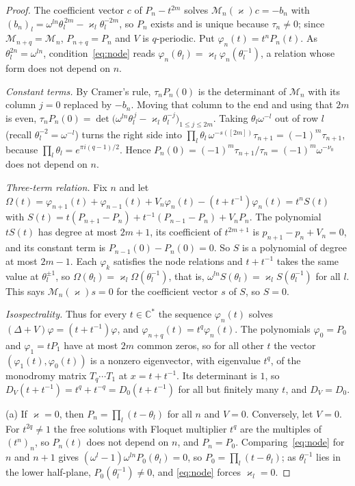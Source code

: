 \documentclass[11pt,reqno]{amsart}
\theoremstyle{definition}
\theoremstyle{remark}
\newcommand{\C}{\mathbb C}
\begin{document}
\begin{proof}
The coefficient vector $c$ of $P_n-t^{2m}$ solves $\mathcal M_n(\varkappa)c=-b_n$ with
$(b_n)_l=\omega^{ln}\theta_l^{\,2m}-\varkappa_l\theta_l^{-2m}$, so $P_n$ exists and is
unique because $\tau_n\ne0$; since $\mathcal M_{n+q}=\mathcal M_n$, $P_{n+q}=P_n$ and $V$ is
$q$-periodic.  Put $\varphi_n(t)=t^nP_n(t)$.  As $\theta_l^{2n}=\omega^{ln}$,
condition~\eqref{eq:node} reads $\varphi_n(\theta_l)=\varkappa_l\varphi_n(\theta_l^{-1})$,
a relation whose form does not depend on $n$.

\emph{Constant terms.}  By Cramer's rule, $\tau_nP_n(0)$ is the determinant of
$\mathcal M_n$ with its column $j=0$ replaced by $-b_n$.  Moving that column to the end
and using that $2m$ is even,
$\tau_nP_n(0)=\det\bigl(\omega^{ln}\theta_l^{\,j}-\varkappa_l\theta_l^{-j}\bigr)_{1\le j\le 2m}$.
Taking $\theta_l\omega^{-l}$ out of row $l$ (recall $\theta_l^{-2}=\omega^{-l}$)
turns the right side into $\prod_l\theta_l\,\omega^{-s([2m])}\tau_{n+1}=(-1)^m\tau_{n+1}$,
because $\prod_l\theta_l=e^{\pi i(q-1)/2}$.  Hence
$P_n(0)=(-1)^m\tau_{n+1}/\tau_n=(-1)^m\omega^{-\nu_0}$ does not depend on $n$.

\emph{Three-term relation.}  Fix $n$ and let
$\Omega(t)=\varphi_{n+1}(t)+\varphi_{n-1}(t)+V_n\varphi_n(t)-(t+t^{-1})\varphi_n(t)=t^nS(t)$ with
$S(t)=t(P_{n+1}-P_n)+t^{-1}(P_{n-1}-P_n)+V_nP_n$.  The polynomial $tS(t)$ has
degree at most $2m+1$, its coefficient of $t^{2m+1}$ is $p_{n+1}-p_n+V_n=0$, and
its constant term is $P_{n-1}(0)-P_n(0)=0$.  So $S$ is a polynomial of degree at
most $2m-1$.  Each $\varphi_k$ satisfies the node relations and $t+t^{-1}$ takes the
same value at $\theta_l^{\pm1}$, so $\Omega(\theta_l)=\varkappa_l\Omega(\theta_l^{-1})$,
that is, $\omega^{ln}S(\theta_l)=\varkappa_lS(\theta_l^{-1})$ for all $l$.  This
says $\mathcal M_n(\varkappa)s=0$ for the coefficient vector $s$ of $S$, so $S=0$.

\emph{Isospectrality.}  Thus for every $t\in\C^*$ the sequence $\varphi_n(t)$ solves
$(\Delta+V)\varphi=(t+t^{-1})\varphi$, and $\varphi_{n+q}(t)=t^q\varphi_n(t)$.  The
polynomials $\varphi_0=P_0$ and $\varphi_1=tP_1$ have at most $2m$ common zeros, so
for all other $t$ the vector $(\varphi_1(t),\varphi_0(t))$ is a nonzero eigenvector,
with eigenvalue $t^q$, of the monodromy matrix $T_q\cdots T_1$ at $x=t+t^{-1}$.
Its determinant is $1$, so $D_V(t+t^{-1})=t^q+t^{-q}=D_0(t+t^{-1})$ for all but
finitely many $t$, and $D_V=D_0$.

(a) If $\varkappa=0$, then $P_n=\prod_l(t-\theta_l)$ for all $n$ and $V=0$.
Conversely, let $V=0$.  For $t^{2q}\ne1$ the free solutions with Floquet
multiplier $t^q$ are the multiples of $(t^n)_n$, so $P_n(t)$ does not depend on
$n$, and $P_n=P_0$.  Comparing~\eqref{eq:node} for $n$ and $n+1$ gives
$(\omega^l-1)\omega^{ln}P_0(\theta_l)=0$, so $P_0=\prod_l(t-\theta_l)$; as
$\theta_l^{-1}$ lies in the lower half-plane, $P_0(\theta_l^{-1})\ne0$, and
\eqref{eq:node} forces $\varkappa_l=0$.


\end{proof}
\end{document}
